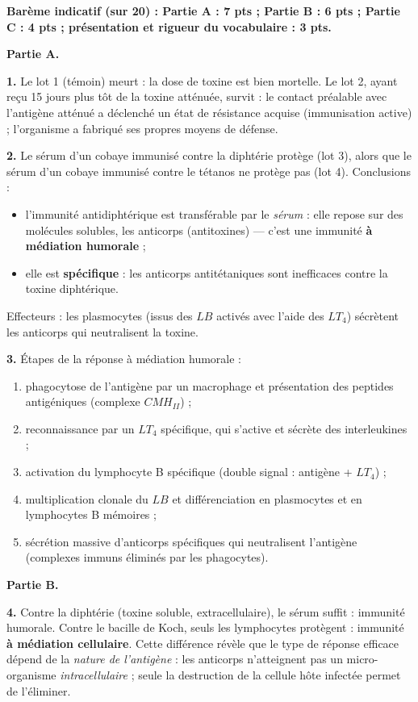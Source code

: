 \documentclass[11pt]{article}
\newcommand{\cle}[1]{{\popxbold\color{popdark}#1}}
\begin{document}
\begin{corrige}

\textbf{Barème indicatif (sur 20) : Partie A : 7 pts ; Partie B : 6 pts ; Partie C : 4 pts ; présentation et rigueur du vocabulaire : 3 pts.}

\textbf{Partie A.}

\textbf{1.} Le lot 1 (témoin) meurt : la dose de toxine est bien mortelle. Le lot 2, ayant reçu 15 jours plus tôt de la toxine atténuée, survit : le contact préalable avec l'antigène atténué a déclenché un état de \cle{résistance acquise} (immunisation active) ; l'organisme a fabriqué ses propres moyens de défense.

\textbf{2.} Le sérum d'un cobaye immunisé contre la diphtérie protège (lot 3), alors que le sérum d'un cobaye immunisé contre le tétanos ne protège pas (lot 4). Conclusions :
\begin{itemize}
\item l'immunité antidiphtérique est transférable par le \emph{sérum} : elle repose sur des molécules solubles, les \cle{anticorps} (antitoxines) — c'est une immunité \textbf{à médiation humorale} ;
\item elle est \textbf{spécifique} : les anticorps antitétaniques sont inefficaces contre la toxine diphtérique.
\end{itemize}
Effecteurs : les plasmocytes (issus des $LB$ activés avec l'aide des $LT_4$) sécrètent les anticorps qui neutralisent la toxine.

\textbf{3.} Étapes de la réponse à médiation humorale :
\begin{enumerate}
\item phagocytose de l'antigène par un macrophage et présentation des peptides antigéniques (complexe $CMH_{II}$) ;
\item reconnaissance par un $LT_4$ spécifique, qui s'active et sécrète des interleukines ;
\item activation du lymphocyte B spécifique (double signal : antigène + $LT_4$) ;
\item multiplication clonale du $LB$ et différenciation en \cle{plasmocytes} et en lymphocytes B mémoires ;
\item sécrétion massive d'anticorps spécifiques qui neutralisent l'antigène (complexes immuns éliminés par les phagocytes).
\end{enumerate}

\textbf{Partie B.}

\textbf{4.} Contre la diphtérie (toxine soluble, extracellulaire), le sérum suffit : immunité humorale. Contre le bacille de Koch, seuls les lymphocytes protègent : immunité \textbf{à médiation cellulaire}. Cette différence révèle que le type de réponse efficace dépend de la \emph{nature de l'antigène} : les anticorps n'atteignent pas un micro-organisme \emph{intracellulaire} ; seule la destruction de la cellule hôte infectée permet de l'éliminer.


\end{corrige}
\end{document}
